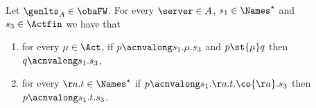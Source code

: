 \begin{lemma}%
  \label{lem:acnvalong-preserved-by-operations}
  \label{lem:acnvalong-preserved-by-annihilation}
  \label{lem:acnv-drop-in-the-middle}
  Let $\genlts_A \in \obaFW$. For every $\server \in \States$, $\traceA \in \Names^\star$ and $\traceC \in \Actfin$ we have that
  \begin{enumerate}
  \item\label{pt:acnvalong-preserved-by-drop-in-the-middle}
        for every $\mu \in \Act$,
        if $\state \acnvalong \traceA.\mu.\traceC$ and $\state \st{\mu} \stateB$ then $\stateB \acnvalong \traceA.\traceC$,
  \item\label{pt:acnvalong-preserved-by-annihilation}
  for every $\aa.\traceB \in \Names^\star$ if
  $\state \acnvalong \traceA.\aa.\traceB.\co{\aa}.\traceC$ then
  $\state \acnvalong \traceA.\traceB.\traceC$.
  \end{enumerate}
\end{lemma}

